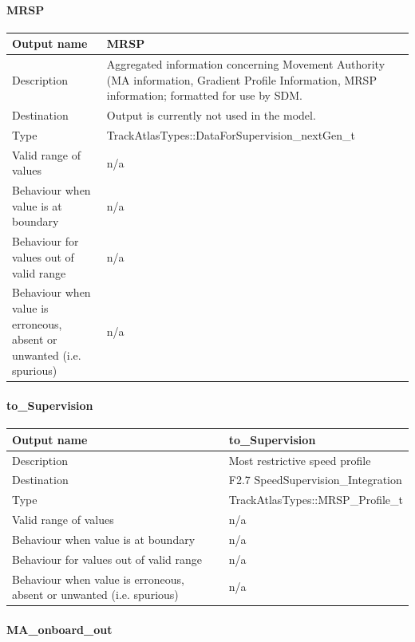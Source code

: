 \paragraph{MRSP}

\begin{longtable}{p{}p{}}
\toprule
Output name				& MRSP \\
\midrule
Description				& Aggregated information concerning Movement Authority (MA information, Gradient Profile Information, MRSP information; formatted for use by SDM. \\
\midrule
Destination				& Output is currently not used in the model.  \\ 
\midrule
Type					& TrackAtlasTypes::DataForSupervision\_nextGen\_t\\
\midrule
Valid range of values	& n/a \\
\midrule
Behaviour when value is at boundary	& n/a  \\
\midrule
Behaviour for values out of valid range	& n/a  \\
\midrule
Behaviour when value is erroneous, absent or unwanted (i.e. spurious) & n/a  \\
\bottomrule
\end{longtable}

\paragraph{to\_Supervision}

\begin{longtable}{p{}p{}}
\toprule
Output name				& to\_Supervision \\
\midrule
Description				& Most restrictive speed profile \\
\midrule
Destination				&F2.7 SpeedSupervision\_Integration  \\ 
\midrule
Type					& TrackAtlasTypes::MRSP\_Profile\_t\\
\midrule
Valid range of values	& n/a \\
\midrule
Behaviour when value is at boundary	& n/a  \\
\midrule
Behaviour for values out of valid range	& n/a  \\
\midrule
Behaviour when value is erroneous, absent or unwanted (i.e. spurious) & n/a  \\
\bottomrule
\end{longtable}

\paragraph{MA\_onboard\_out}


